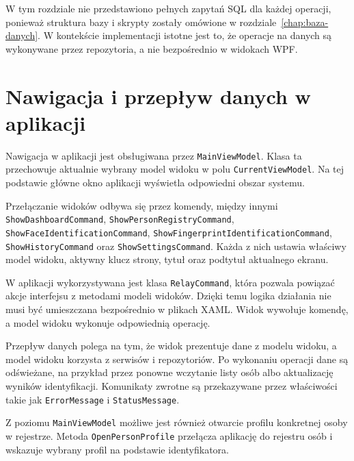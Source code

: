 W tym rozdziale nie przedstawiono pełnych zapytań SQL dla każdej operacji, ponieważ struktura bazy i skrypty zostały omówione w rozdziale~\ref{chap:baza-danych}. W kontekście implementacji istotne jest to, że operacje na danych są wykonywane przez repozytoria, a nie bezpośrednio w widokach WPF.

\section{Nawigacja i przepływ danych w aplikacji}

Nawigacja w aplikacji jest obsługiwana przez \texttt{MainViewModel}. Klasa ta przechowuje aktualnie wybrany model widoku w polu \texttt{CurrentViewModel}. Na tej podstawie główne okno aplikacji wyświetla odpowiedni obszar systemu.

Przełączanie widoków odbywa się przez komendy, między innymi \texttt{ShowDashboardCommand}, \texttt{ShowPersonRegistryCommand}, \texttt{ShowFaceIdentificationCommand}, \newline \texttt{ShowFingerprintIdentificationCommand}, \texttt{ShowHistoryCommand} oraz \newline \texttt{ShowSettingsCommand}. Każda z nich ustawia właściwy model widoku, aktywny klucz strony, tytuł oraz podtytuł aktualnego ekranu.

W aplikacji wykorzystywana jest klasa \texttt{RelayCommand}, która pozwala powiązać akcje interfejsu z metodami modeli widoków. Dzięki temu logika działania nie musi być umieszczana bezpośrednio w plikach XAML. Widok wywołuje komendę, a model widoku wykonuje odpowiednią operację.

Przepływ danych polega na tym, że widok prezentuje dane z modelu widoku, a model widoku korzysta z serwisów i repozytoriów. Po wykonaniu operacji dane są odświeżane, na przykład przez ponowne wczytanie listy osób albo aktualizację wyników identyfikacji. Komunikaty zwrotne są przekazywane przez właściwości takie jak \texttt{ErrorMessage} i \texttt{StatusMessage}.

Z poziomu \texttt{MainViewModel} możliwe jest również otwarcie profilu konkretnej osoby w rejestrze. Metoda \texttt{OpenPersonProfile} przełącza aplikację do rejestru osób i wskazuje wybrany profil na podstawie identyfikatora.